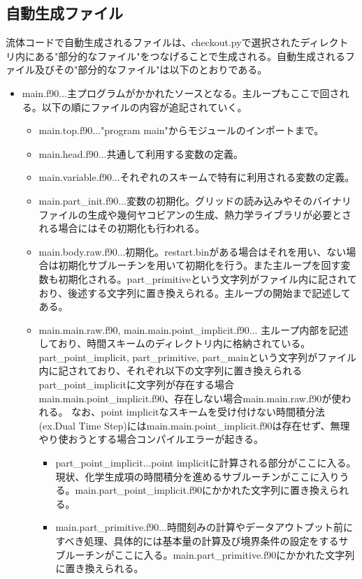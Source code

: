 \documentclass{jsarticle}
\begin{document}
\subsection{自動生成ファイル}%
流体コードで自動生成されるファイルは、checkout.pyで選択されたディレクトリ内にある"部分的なファイル"をつなげることで生成される。自動生成されるファイル及びその"部分的なファイル"は以下のとおりである。
\begin{itemize}
\item main.f90...主プログラムがかかれたソースとなる。主ループもここで回される。以下の順にファイルの内容が追記されていく。
\begin{itemize}
\item main.top.f90..."program main"からモジュールのインポートまで。
\item main.head.f90...共通して利用する変数の定義。
\item main.variable.f90...それぞれのスキームで特有に利用される変数の定義。
\item main.part\_init.f90...変数の初期化。グリッドの読み込みやそのバイナリファイルの生成や幾何ヤコビアンの生成、熱力学ライブラリが必要とされる場合にはその初期化も行われる。
\item main.body.raw.f90...初期化。restart.binがある場合はそれを用い、ない場合は初期化サブルーチンを用いて初期化を行う。また主ループを回す変数も初期化される。part\_primitiveという文字列がファイル内に記されており、後述する文字列に置き換えられる。主ループの開始まで記述してある。
\item main.main.raw.f90, main.main.point\_implicit.f90...
主ループ内部を記述しており、時間スキームのディレクトリ内に格納されている。
part\_point\_implicit, part\_primitive, part\_mainという文字列がファイル内に記されており、それぞれ以下の文字列に置き換えられる
part\_point\_implicitに文字列が存在する場合main.main.point\_implicit.f90、存在しない場合main.main.raw.f90が使われる。
なお、point implicitなスキームを受け付けない時間積分法(ex.Dual Time Step)にはmain.main.point\_implicit.f90は存在せず、無理やり使おうとする場合コンパイルエラーが起きる。
\begin{itemize}
\item part\_point\_implicit...point implicitに計算される部分がここに入る。現状、化学生成項の時間積分を進めるサブルーチンがここに入りうる。main.part\_point\_implicit.f90にかかれた文字列に置き換えられる。
\item main.part\_primitive.f90...時間刻みの計算やデータアウトプット前にすべき処理、具体的には基本量の計算及び境界条件の設定をするサブルーチンがここに入る。main.part\_primitive.f90にかかれた文字列に置き換えられる。

\end{itemize}
\end{itemize}
\end{itemize}
\end{document}
